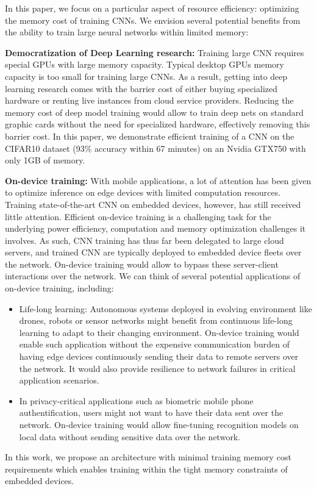 \documentclass[twocolumn]{bmcart}
\begin{document}
In this paper, we focus on a particular aspect of resource efficiency: optimizing the memory cost of training CNNs. 
We envision several potential benefits from the ability to train large neural networks within limited memory:

\textbf{Democratization of Deep Learning research:} 
Training large CNN requires special GPUs with large memory capacity. 
Typical desktop GPUs memory capacity is too small for training large CNNs.
As a result, getting into deep learning research comes with the barrier cost of either buying specialized hardware or renting live instances from cloud service providers. 
Reducing the memory cost of deep model training would allow to train deep nets on standard graphic cards without the need for specialized hardware, effectively removing this barrier cost.
In this paper, we demonstrate efficient training of a CNN on the CIFAR10 dataset (93\% accuracy within 67 minutes) on an Nvidia GTX750 with only 1GB of memory.

\textbf{On-device training:}
With mobile applications, a lot of attention has been given to optimize inference on edge devices with limited computation resources.
Training state-of-the-art CNN on embedded devices, however, has still received little attention.
Efficient on-device training is a challenging task for the underlying power efficiency, computation and memory optimization challenges it involves.
As such, CNN training has thus far been delegated to large cloud servers, and trained CNN are typically deployed to embedded device fleets over the network.  
On-device training would allow to bypass these server-client interactions over the network. 
We can think of several potential applications of on-device training, including:
\begin{itemize}
 \item Life-long learning: Autonomous systems deployed in evolving environment like drones, robots or sensor networks might benefit from continuous life-long learning to adapt to their changing environment. 
On-device training would enable such application without the expensive communication burden of having edge devices continuously sending their data to remote servers over the network. It would also provide resilience to network failures in critical application scenarios.
 \item In privacy-critical applications such as biometric mobile phone authentification, users might not want to have their data sent over the network. 
On-device training would allow fine-tuning recognition models on local data without sending sensitive data over the network.
\end{itemize}
In this work, we propose an architecture with minimal training memory cost requirements which enables training within the tight memory constraints of embedded devices. 
\end{document}
